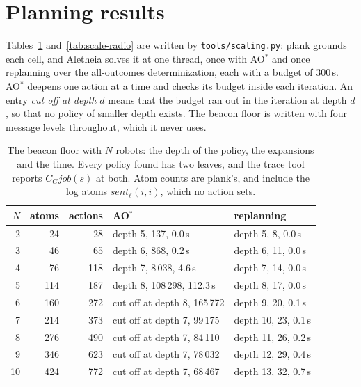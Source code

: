 \documentclass[11pt,a4paper]{article}
\theoremstyle{definition}
\newcommand{\Cop}[1]{C_{#1}}
\newcommand{\code}[1]{\texttt{\small #1}}
\newcommand{\job}{\mathit{job}}
\newcommand{\sent}{\mathit{sent}}
\begin{document}
\section{Planning results}
\label{sec:planning}

Tables~\ref{tab:scale-beacon} and~\ref{tab:scale-radio} are written by
\code{tools/scaling.py}: plank grounds each cell, and Aletheia solves it at one
thread, once with AO$^*$ and once replanning over the all-outcomes
determinization, each with a budget of 300\,s. AO$^*$ deepens one action at a
time and checks its budget inside each iteration. An entry \emph{cut off at
depth $d$} means that the budget ran out in the iteration at depth $d$, so that
no policy of smaller depth exists. The beacon floor is written with four
message levels throughout, which it never uses.

\begin{table}[H]
\centering\small
\caption{The beacon floor with $N$ robots: the depth of the policy, the
expansions and the time. Every policy found has two leaves, and the trace tool
reports $\Cop{G}\job(s)$ at both. Atom counts are plank's, and include the log
atoms $\sent_\ell(i,i)$, which no action sets.}
\label{tab:scale-beacon}
\begin{tabular}{@{}r r r l l@{}}
\toprule
$N$ & atoms & actions & AO$^*$ & replanning \\
\midrule
2 & 24 & 28 & depth 5, 137, 0.0\,s & depth 5, 8, 0.0\,s \\
3 & 46 & 65 & depth 6, 868, 0.2\,s & depth 6, 11, 0.0\,s \\
4 & 76 & 118 & depth 7, 8\,038, 4.6\,s & depth 7, 14, 0.0\,s \\
5 & 114 & 187 & depth 8, 108\,298, 112.3\,s & depth 8, 17, 0.0\,s \\
6 & 160 & 272 & cut off at depth 8, 165\,772 & depth 9, 20, 0.1\,s \\
7 & 214 & 373 & cut off at depth 7, 99\,175 & depth 10, 23, 0.1\,s \\
8 & 276 & 490 & cut off at depth 7, 84\,110 & depth 11, 26, 0.2\,s \\
9 & 346 & 623 & cut off at depth 7, 78\,032 & depth 12, 29, 0.4\,s \\
10 & 424 & 772 & cut off at depth 7, 68\,467 & depth 13, 32, 0.7\,s \\
\bottomrule
\end{tabular}
\end{table}
\end{document}
